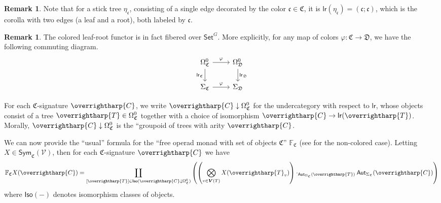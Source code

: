 \documentclass[a4paper,10pt
,draft
]{article}%
\numberwithin{equation}{section}
\numberwithin{figure}{section}
\theoremstyle{definition} %
\newtheorem{remark}[equation]{Remark}%
\newcommand{\vect}[1]{\text{\overrightharp{\ensuremath{#1}}}}
\newcommand{\V}{\ensuremath{\mathcal V}}
\newcommand{\1}{\ensuremath{\mathbbm 1}}%
\begin{document}
\begin{remark}\label{ETACNOT REM}
	Note that for a stick tree $\eta_{\mathfrak{c}}$,
	consisting of a single edge decorated by the color 
	$\mathfrak{c} \in \mathfrak{C}$,
	it is 
	$\mathsf{lr}(\eta_{\mathfrak{c}}) = (\mathfrak{c};\mathfrak{c})$,
	which is the corolla with two edges (a leaf and a root),
	both labeled by $\mathfrak{c}$.
\end{remark}

\begin{remark}
	The colored leaf-root functor is in fact fibered over $\mathsf{Set}^G$.
	More explicitly, for any map of colors 
	$\varphi \colon \mathfrak C \to \mathfrak D$,
	we have the following commuting diagram.
	\begin{equation}
	\label{COLORLR_EQ}
	\begin{tikzcd}
	\Omega_{\mathfrak C}^0 \arrow[r, "\varphi"] \arrow[d, "\mathsf{lr}_{\mathfrak C}"']
	&
	\Omega_{\mathfrak D}^0 \arrow[d, "\mathsf{lr}_{\mathfrak D}"]
	\\
	\Sigma_{\mathfrak C} \arrow[r, "\varphi"]
	&
	\Sigma_{\mathfrak D}
	\end{tikzcd}
	\end{equation}
\end{remark}

For each $\mathfrak{C}$-signature $\vect{C}$,
we write $\vect{C} \downarrow \Omega_{\mathfrak{C}}^0$
for the undercategory with respect to $\mathsf{lr}$, 
whose objects consist of a tree $\vect{T}\in \Omega_{\mathfrak{C}}^0$
together with a choice of isomorphism 
$\vect{C} \to \mathsf{lr}(\vect{T})$.
Morally, $\vect{C} \downarrow \Omega_{\mathfrak{C}}^0$
is the ``groupoid of trees with arity $\vect{C}$. 

We can now provide the ``usual'' formula for the ``free operad monad with set of objects $\mathfrak C$'' $\mathbb F_{\mathfrak C}$
(see \cite[page 816]{BM07} for the non-colored case).
Letting $X \in \mathsf{Sym}_{\mathfrak{C}}(\V)$,
then for each $\mathfrak{C}$-signature $\vect{C}$ we have
\begin{equation}
        \label{FROPEXP EQ}
        \mathbb{F}_{\mathfrak{C}} X (\vect{C})
        =
        \coprod_{[\vect{T}] \in 
          \mathsf{Iso}(\vect{C} \downarrow \Omega^0_{\mathfrak{C}})}
        \left(
                \left(
                        \bigotimes_{v \in \boldsymbol{V}(T)} X(\vect{T}_v)
                \right)
                \cdot_{\mathsf{Aut}_{\Omega_{\mathfrak{C}}}(\vect{T})}
                \mathsf{Aut}_{\Sigma_{\mathfrak{C}}}(\vect{C})
        \right)
\end{equation}
where $\mathsf{Iso}(-)$ denotes isomorphism classes of objects.
\end{document}
